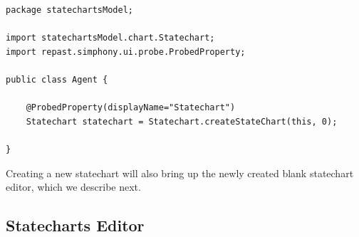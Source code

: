\documentclass[11pt]{amsart}
\begin{document}
\noindent\begin{minipage}[h]{\textwidth}
\vspace{.2in}
\lstset{language=java,caption=Agent class with the default injected statechart field.,label=lst:injectedStatechart}
\begin{lstlisting}
package statechartsModel;

import statechartsModel.chart.Statechart;
import repast.simphony.ui.probe.ProbedProperty;

public class Agent {

	@ProbedProperty(displayName="Statechart")
	Statechart statechart = Statechart.createStateChart(this, 0);

}
\end{lstlisting}
\vspace{.2in}
\end{minipage}

Creating a new statechart will also bring up the newly created blank statechart editor, which we describe next.





\clearpage

\subsection{Statecharts Editor}
\end{document}
